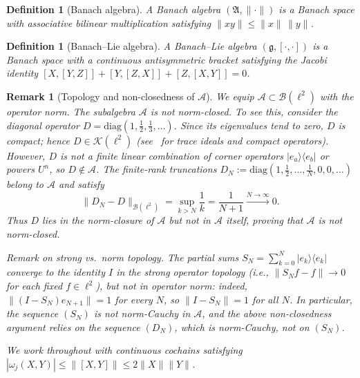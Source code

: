 \documentclass[10pt]{amsart}
\newcommand{\1}{{\mathbb{I}}}
\newtheorem{remark}[theorem]{Remark}
\newtheorem{definition}[theorem]{Definition}
\numberwithin{equation}{section}
\begin{document}
\begin{definition}[Banach algebra]\label{def:Banach-alg}
A \emph{Banach algebra} $(\mathfrak{A},\|\cdot\|)$ is a Banach space with associative
bilinear multiplication satisfying $\|xy\| \leq \|x\|\,\|y\|$.
\end{definition}

\begin{definition}[Banach--Lie algebra]\label{def:Banach-Lie}
A \emph{Banach--Lie algebra} $(\mathfrak{g},[\cdot,\cdot])$ is a Banach space with a
continuous antisymmetric bracket satisfying the Jacobi identity
$[X,[Y,Z]] + [Y,[Z,X]] + [Z,[X,Y]] = 0$.
\end{definition}

\begin{remark}[Topology and non-closedness of $\mathcal{A}$]\label{rem:topology}
We equip $\mathcal{A} \subset \mathcal{B}(\ell^2)$ with the operator norm. The subalgebra
$\mathcal{A}$ is \emph{not} norm-closed. To see this, consider the diagonal operator
$D = \mathrm{diag}(1, \tfrac{1}{2}, \tfrac{1}{3}, \ldots)$. Since its eigenvalues tend
to zero, $D$ is compact; hence $D \in \mathcal{K}(\ell^2)$ (see~\cite{Sim05} for trace ideals
and compact operators). However, $D$ is not a finite
linear combination of corner operators $|e_a\rangle\langle e_b|$ or powers $U^n$, so
$D \notin \mathcal{A}$. The finite-rank truncations
$D_N := \mathrm{diag}(1,\tfrac{1}{2},\ldots,\tfrac{1}{N},0,0,\ldots)$
belong to $\mathcal{A}$ and satisfy
\[
\|D_N - D\|_{\mathcal{B}(\ell^2)} = \sup_{k > N}\frac{1}{k} = \frac{1}{N+1} \xrightarrow{N\to\infty} 0.
\]
Thus $D$ lies in the norm-closure of $\mathcal{A}$ but not in $\mathcal{A}$ itself,
proving that $\mathcal{A}$ is not norm-closed.

\smallskip
\noindent\textit{Remark on strong vs.\ norm topology.}
The partial sums $S_N = \sum_{k=0}^{N} |e_k\rangle\langle e_k|$ converge to the
identity $I$ in the \emph{strong operator topology} (i.e., $\|S_N f - f\| \to 0$ for
each fixed $f \in \ell^2$), but \emph{not} in operator norm: indeed,
$\|(I - S_N)e_{N+1}\| = 1$ for every $N$, so $\|I - S_N\| = 1$ for all $N$.
In particular, the sequence $(S_N)$ is \emph{not} norm-Cauchy in $\mathcal{A}$, and
the above non-closedness argument relies on the sequence $(D_N)$, which \emph{is}
norm-Cauchy, not on $(S_N)$.

We work throughout with continuous cochains satisfying
$|\omega_j(X,Y)| \leq \|[X,Y]\| \leq 2\|X\|\|Y\|$.
\end{remark}
\end{document}

